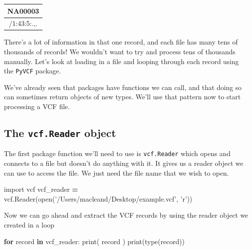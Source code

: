 \documentclass[]{book}
\newenvironment{Shaded}{\begin{snugshade}}{\end{snugshade}}
\newcommand{\BuiltInTok}[1]{#1}
\newcommand{\ControlFlowTok}[1]{\textcolor[rgb]{0.13,0.29,0.53}{\textbf{#1}}}
\newcommand{\ImportTok}[1]{#1}
\newcommand{\KeywordTok}[1]{\textcolor[rgb]{0.13,0.29,0.53}{\textbf{#1}}}
\newcommand{\NormalTok}[1]{#1}
\newcommand{\OperatorTok}[1]{\textcolor[rgb]{0.81,0.36,0.00}{\textbf{#1}}}
\newcommand{\StringTok}[1]{\textcolor[rgb]{0.31,0.60,0.02}{#1}}
\theoremstyle{definition}
\theoremstyle{definition}
\theoremstyle{definition}
\theoremstyle{remark}
\begin{document}
\begin{longtable}[]{@{}c@{}}
\toprule
\begin{minipage}[b]{0.20\columnwidth}\centering
NA00003\strut
\end{minipage}\tabularnewline
\midrule
\endhead
\begin{minipage}[t]{0.20\columnwidth}\centering
1/1:43:5:.,.\strut
\end{minipage}\tabularnewline
\bottomrule
\end{longtable}

There's a lot of information in that one record, and each file has many
tens of thousands of records! We wouldn't want to try and process tens
of thousands manually. Let's look at loading in a file and looping
through each record using the \texttt{PyVCF} package.

We've already seen that packages have functions we can call, and that
doing so can sometimes return objects of new types. We'll use that
pattern now to start processing a VCF file.

\hypertarget{the-vcf.reader-object}{%
\subsection{\texorpdfstring{The \texttt{vcf.Reader}
object}{The vcf.Reader object}}\label{the-vcf.reader-object}}

The first package function we'll need to use is \texttt{vcf.Reader}
which opens and connects to a file but doesn't do anything with it. It
gives us a reader object we can use to access the file. We just need the
file name that we wish to open.

\begin{Shaded}
\begin{Highlighting}[]
\ImportTok{import}\NormalTok{ vcf}
\NormalTok{vcf_reader }\OperatorTok{=}\NormalTok{ vcf.Reader(}\BuiltInTok{open}\NormalTok{(}\StringTok{'/Users/macleand/Desktop/example.vcf'}\NormalTok{, }\StringTok{'r'}\NormalTok{))}
\end{Highlighting}
\end{Shaded}

Now we can go ahead and extract the VCF records by using the reader
object we created in a loop

\begin{Shaded}
\begin{Highlighting}[]
\ControlFlowTok{for}\NormalTok{ record }\KeywordTok{in}\NormalTok{ vcf_reader:}
  \BuiltInTok{print}\NormalTok{( record )}
  \BuiltInTok{print}\NormalTok{(}\BuiltInTok{type}\NormalTok{(record))}
\end{Highlighting}
\end{Shaded}
\end{document}
